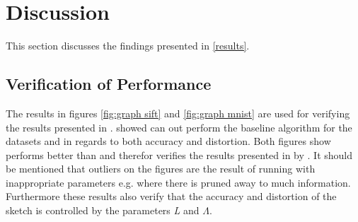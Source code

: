 \section{Discussion}
\label{discussion}
This section discusses the findings presented in \ref{results}.

\subsection{Verification of Performance}
The results in figures \ref{fig:graph sift} and \ref{fig:graph mnist} are used for verifying the results presented in \cite{wagner17}. \cite{wagner17} showed \qs{} can out perform the baseline algorithm \grid{} for the datasets \sift{} and \mnist{} in regards to both accuracy and distortion. Both figures show \qs{} performs better than \grid{} and therefor verifies the results presented in by \cite{wagner17}. It should be mentioned that outliers on the figures are the result of running \qs{} with inappropriate parameters e.g. where there is pruned away to much information. Furthermore these results also verify that the accuracy and distortion of the sketch is controlled by the parameters \textit{L} and $\Lambda$.  

